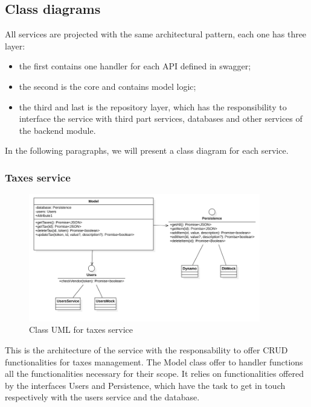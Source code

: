 \subsection{Class diagrams}\label{_classDiagram}
All services are projected with the same architectural pattern, each one has three layer:
\begin{itemize}
    \item the first contains one handler for each API defined in swagger;
    \item the second is the core and contains model logic;
    \item the third and last is the repository layer, which has the responsibility to interface the
          service with third part services, databases and other services of the backend module.
\end{itemize}
In the following paragraphs, we will present a class diagram for each service.


\subsubsection{Taxes service}
\begin{figure}[H]
    \includegraphics[width=0.9\textwidth]{res/images/class-diagrams/taxes.png}
    \caption{Class UML for taxes service}
\end{figure}
This is the architecture of the service with the responsability to offer CRUD functionalities for taxes management.
The Model class offer to handler functions all the functionalities necessary for their scope. It relies on functionalities
offered by the interfaces Users and Persistence, which have the task to get in touch respectively with the users service and the
database.

